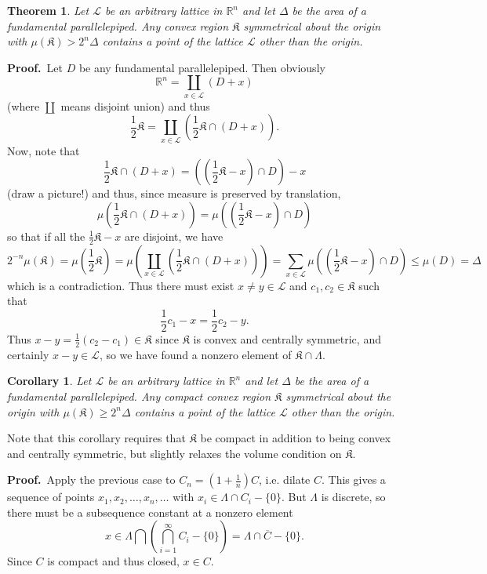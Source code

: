 \documentclass[12pt]{article}
\newcommand{\Reals}{\mathbb{R}}
\newcommand{\Reg}{\mathfrak{K}}
\newcommand{\Lat}{\mathcal{L}}
\newtheorem{thm}{Theorem}
\newtheorem{cor}{Corollary}
\begin{document}
\begin{thm}
Let $\Lat$ be an arbitrary lattice in $\Reals^n$ and let $\Delta$ be the area of a fundamental parallelepiped. Any convex region $\Reg$ symmetrical about the origin with $\mu(\Reg)>2^n\Delta$ contains a point of the lattice $\Lat$ other than the origin.
\end{thm}

\textbf{Proof.}\  Let $D$ be any fundamental parallelepiped. Then obviously
\[\Reals^n = \coprod_{x\in\Lat} (D+x)\]
(where $\coprod$ means disjoint union) and thus
\[\frac{1}{2}\Reg = \coprod_{x\in\Lat} \left(\frac{1}{2}\Reg\cap(D+x)\right).\]
Now, note that
\[\frac{1}{2}\Reg\cap (D+x)=\left(\left(\frac{1}{2}\Reg-x\right)\cap D\right)-x\]
(draw a picture!) and thus, since measure is preserved by translation,
\[\mu\left(\frac{1}{2}\Reg\cap (D+x)\right)=\mu\left(\left(\frac{1}{2}\Reg-x\right)\cap D\right)\]
so that if all the $\frac{1}{2}\Reg-x$ are disjoint, we have
\[2^{-n}\mu(\Reg)=\mu\left(\frac{1}{2}\Reg\right) = \mu\left(\coprod_{x\in\Lat} \left(\frac{1}{2}\Reg\cap(D+x)\right)\right)=\sum_{x\in\Lat}\mu\left(\left(\frac{1}{2}\Reg-x\right)\cap D\right)\leq \mu(D) = \Delta\]
which is a contradiction. Thus there must exist $x\neq y\in\Lat$ and $c_1,c_2\in \Reg$ such that 
\[\frac{1}{2}c_1-x = \frac{1}{2}c_2-y.\]
Thus $x-y=\frac{1}{2}(c_2-c_1)\in \Reg$ since $\Reg$ is convex and centrally symmetric, and certainly $x-y\in\Lat$, so we have found a nonzero element of $\Reg\cap\Lambda$.

\begin{cor} Let $\Lat$ be an arbitrary lattice in $\Reals^n$ and let $\Delta$ be the area of a fundamental parallelepiped. Any compact convex region $\Reg$ symmetrical about the origin with $\mu(\Reg)\geq 2^n\Delta$ contains a point of the lattice $\Lat$ other than the origin.
\end{cor}
Note that this corollary requires that $\Reg$ be compact in addition to being convex and centrally symmetric, but slightly relaxes the volume condition on $\Reg$.

\textbf{Proof.}\ Apply the previous case to $C_n=\left(1+\frac{1}{n}\right)C$, i.e. dilate $C$. This gives a sequence of points $x_1, x_2, \ldots, x_n, \ldots$ with $x_i\in \Lambda\cap C_i-\{0\}$. But $\Lambda$ is discrete, so there must be a subsequence constant at a nonzero element
\[x \in \Lambda \bigcap \left( \bigcap_{i=1}^{\infty} C_i-\{0\} \right) = \Lambda \cap \overline{C}-\{0\}.\]
Since $C$ is compact and thus closed, $x\in C$.
\end{document}
